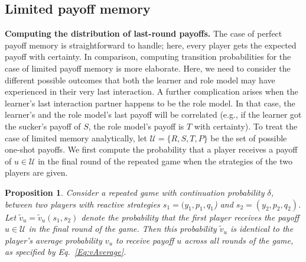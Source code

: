 \documentclass[11pt]{article}
\def\strategy{s}
\theoremstyle{plainCl1}
\newtheorem{Prop}{Proposition}
\theoremstyle{plainCl2}
\begin{document}
\subsection{Limited payoff memory}\label{section:limited_memory}


{\bf Computing the distribution of last-round payoffs.}
The case of perfect payoff memory is straightforward to handle; here, every player gets the expected payoff with certainty. 
In comparison, computing transition probabilities for the case of limited payoff memory is more elaborate. 
Here, we need to consider the different possible outcomes that both the learner and role model may have experienced in their very last interaction. 
A further complication arises when the learner's last interaction partner happens to be the role model. 
In that case, the learner's and the role model's last payoff will be correlated (e.g., if the learner got the sucker's payoff of $S$, the role model's payoff is $T$ with certainty). 
To treat the case of limited memory analytically, let $\mathcal{U} \!=\! \{R,S,T,P\}$ be the set of possible one-shot payoffs. 
We first  compute the probability that a player receives a payoff of $u\!\in\!\mathcal{U}$ in the final round of the repeated game when the strategies of the two players are given. 


\begin{Prop}\label{proposition:last_round} 
Consider a repeated game with continuation probability $\delta$, between two players with reactive strategies $\strategy_1\!=\!(y_1, p_1, q_1$)  and $\strategy_2\!=\!(y_2,p_2,q_2)$. 
Let $\tilde{v}_u\!=\!\tilde{v}_u(\strategy_1,\strategy_2)$ denote the probability that the first player receives the payoff $u\!\in\!\mathcal{U}$ in the final round of the game. 
Then this probability  $\tilde{v}_u$ is identical to the player's average probability $v_u$ to receive payoff $u$ across all rounds of the game, as specified by Eq.~\eqref{Eq:vAverage}.
\end{Prop}
\end{document}
